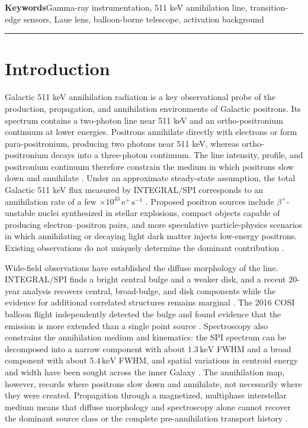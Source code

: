 \documentclass[11pt]{article}
\newcommand{\keV}{\ensuremath{\,\mathrm{keV}}}
\begin{document}
\vspace{0.7em}
\noindent\textbf{Keywords}\hspace{0.7em}Gamma-ray instrumentation, 511 keV annihilation line, transition-edge sensors, Laue lens, balloon-borne telescope, activation background

\vspace{0.3em}
\noindent\rule{\textwidth}{0.4pt}
\vspace{1.0em}

\section{Introduction}
\label{sec:introduction}

Galactic 511 keV annihilation radiation is a key observational probe of the
production, propagation, and annihilation environments of Galactic positrons.
Its spectrum contains a two-photon line near 511 keV and an ortho-positronium
continuum at lower energies. Positrons annihilate directly with electrons or
form para-positronium, producing two photons near 511 keV, whereas
ortho-positronium decays into a three-photon continuum. The line intensity,
profile, and positronium continuum therefore constrain the medium in which
positrons slow down and annihilate \cite{Prantzos2011,Jean2006}. Under an
approximate steady-state assumption, the total Galactic 511 keV flux measured
by INTEGRAL/SPI corresponds to an annihilation rate of a few
$\times10^{43}\,\mathrm{e^+\,s^{-1}}$ \cite{Prantzos2011,Kierans2020}. Proposed
positron sources include $\beta^+$-unstable nuclei synthesized in stellar
explosions, compact objects capable of producing electron--positron pairs, and
more speculative particle-physics scenarios in which annihilating or decaying
light dark matter injects low-energy positrons. Existing observations do not
uniquely determine the dominant contribution
\cite{Prantzos2011,Siegert2016AA,Siegert2016V404}.

Wide-field observations have established the diffuse morphology of the line.
INTEGRAL/SPI finds a bright central bulge and a weaker disk, and a recent
20-year analysis recovers central, broad-bulge, and disk components while the
evidence for additional correlated structures remains marginal
\cite{Knodlseder2005AllSky,Siegert2016AA,Yoneda2025}. The 2016 COSI balloon flight independently
detected the bulge and found evidence that the emission is more extended than a
single point source \cite{Kierans2020,Siegert2020COSI}. Spectroscopy also
constrains the annihilation medium and kinematics: the SPI spectrum can be
decomposed into a narrow component with about $1.3\keV$ FWHM and a broad
component with about $5.4\keV$ FWHM, and spatial variations in centroid energy
and width have been sought across the inner Galaxy
\cite{Jean2006,Siegert2019Kinematics}. The annihilation map, however, records
where positrons slow down and annihilate, not necessarily where they were
created. Propagation through a magnetized, multiphase interstellar medium means
that diffuse morphology and spectroscopy alone cannot recover the dominant
source class or the complete pre-annihilation transport history
\cite{Prantzos2011}.
\end{document}
